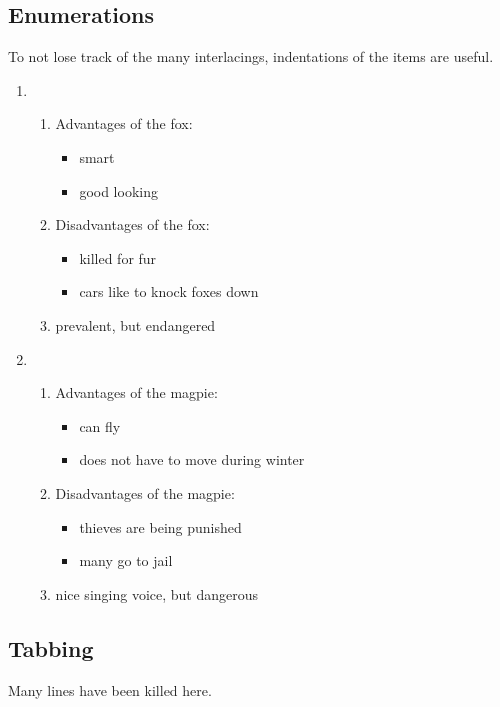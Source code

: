 \subsection{Enumerations}
To not lose track of the many interlacings, indentations of the items are useful.
\begin{enumerate}
  \item 
  \begin{enumerate}
    \item Advantages of the fox:
    \begin{itemize}
      \item smart
      \item good looking
    \end{itemize}
    \item Disadvantages of the fox:
    \begin{itemize}
      \item killed for fur
      \item cars like to knock foxes down
    \end{itemize}
    \item prevalent, but endangered
  \end{enumerate}
  \item
  \begin{enumerate}
    \item Advantages of the magpie:
    \begin{itemize}
      \item can fly
      \item does not have to move during winter
    \end{itemize}
    \item Disadvantages of the magpie:
    \begin{itemize}
      \item thieves are being punished
      \item many go to jail
    \end{itemize}
      \item nice singing voice, but dangerous
  \end{enumerate}
\end{enumerate}

\subsection{Tabbing}

Many lines have been killed here.\\

